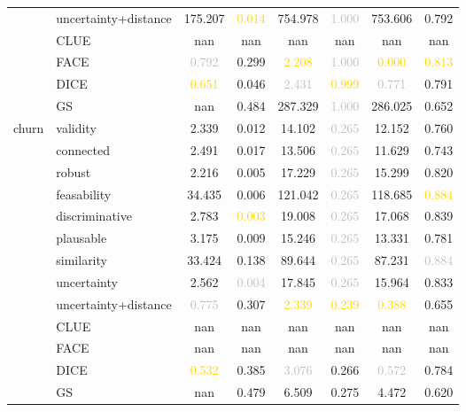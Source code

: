 \begin{table}[ht]
\begin{tabular}{l l c c c c c c}
 & uncertainty+distance & 175.207 & \textcolor{gold}{0.014} & 754.978 & \textcolor{silver}{1.000} & 753.606 & \textcolor{bronze}{0.792} \\
 & CLUE & nan & nan & nan & nan & nan & nan \\
 & FACE & \textcolor{silver}{0.792} & 0.299 & \textcolor{gold}{2.208} & \textcolor{silver}{1.000} & \textcolor{gold}{0.000} & \textcolor{gold}{0.813} \\
 & DICE & \textcolor{gold}{0.651} & 0.046 & \textcolor{silver}{2.431} & \textcolor{gold}{0.999} & \textcolor{silver}{0.771} & 0.791 \\
 & GS & nan & 0.484 & \textcolor{bronze}{287.329} & \textcolor{silver}{1.000} & \textcolor{bronze}{286.025} & 0.652 \\
\hline
\multirow{13}{*}{churn} & validity & 2.339 & 0.012 & 14.102 & \textcolor{silver}{0.265} & 12.152 & 0.760 \\
 & connected & 2.491 & 0.017 & 13.506 & \textcolor{silver}{0.265} & 11.629 & 0.743 \\
 & robust & \textcolor{bronze}{2.216} & \textcolor{bronze}{0.005} & 17.229 & \textcolor{silver}{0.265} & 15.299 & 0.820 \\
 & feasability & 34.435 & 0.006 & 121.042 & \textcolor{silver}{0.265} & 118.685 & \textcolor{gold}{0.884} \\
 & discriminative & 2.783 & \textcolor{gold}{0.003} & 19.008 & \textcolor{silver}{0.265} & 17.068 & \textcolor{bronze}{0.839} \\
 & plausable & 3.175 & 0.009 & 15.246 & \textcolor{silver}{0.265} & 13.331 & 0.781 \\
 & similarity & 33.424 & 0.138 & 89.644 & \textcolor{silver}{0.265} & 87.231 & \textcolor{silver}{0.884} \\
 & uncertainty & 2.562 & \textcolor{silver}{0.004} & 17.845 & \textcolor{silver}{0.265} & 15.964 & 0.833 \\
 & uncertainty+distance & \textcolor{silver}{0.775} & 0.307 & \textcolor{gold}{2.339} & \textcolor{gold}{0.239} & \textcolor{gold}{0.388} & 0.655 \\
 & CLUE & nan & nan & nan & nan & nan & nan \\
 & FACE & nan & nan & nan & nan & nan & nan \\
 & DICE & \textcolor{gold}{0.532} & 0.385 & \textcolor{silver}{3.076} & \textcolor{bronze}{0.266} & \textcolor{silver}{0.572} & 0.784 \\
 & GS & nan & 0.479 & \textcolor{bronze}{6.509} & 0.275 & \textcolor{bronze}{4.472} & 0.620 \\

\end{tabular}
\end{table}
